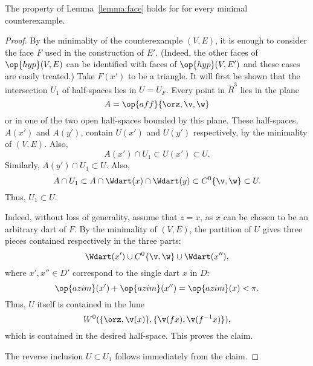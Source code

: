 
\begin{lemma}  The property  of Lemma~\ref{lemma:face} holds for for every minimal counterexample.
\end{lemma}
%

\begin{proof}
By the minimality of the counterexample $(V,E)$, it is enough to consider
the face $F$ used in the construction of $E'$.  (Indeed, the other faces of $\op{hyp}(V,E)$ can be identified with faces of $\op{hyp}(V,E')$ and these cases are easily treated.) Take $F(x')$ to be a triangle.
It will first be shown that the intersection $U_1$ of half-spaces lies in $U=U_F$.
Every point in $\ring{R}^3$ lies in the plane
$$
A=\op{aff}\{\orz,\v,\w\}
$$
or in one of the two open half-spaces bounded by this plane.  These half-spaces, $A(x')$ and $A(y')$, 
contain $U(x')$ and $U(y')$ respectively, by the minimality of $(V,E)$.  Also,
$$
A(x')\cap U_1 \subset U(x')\subset U.
$$
Similarly, $A(y')\cap U_1 \subset U$.  Also,
$$
A \cap U_1 \subset A \cap \Wdart(x) \cap \Wdart(y) \subset C^0\{\v,\w\} \subset U.
$$
Thus,
$U_1\subset U$.

 Indeed, without loss of generality, assume that $z=x$, 
as $x$ can be chosen to be an
arbitrary dart of $F$.  By the minimality of $(V,E)$,  
the partition  of $U$ gives three pieces
contained respectively in the three parts:
$$
\Wdart(x') \cup C^0\{\v,\w\} \cup \Wdart(x''),
$$
where $x',x''\in D'$ correspond to the single dart $x$ in $D$:
$$
\op{azim}(x') + \op{azim}(x'') = \op{azim}(x) < \pi.
$$
Thus, $U$ itself is contained in the lune
$$
W^0(\{\orz,\v(x)\},\{\v(f x),\v(f^{-1} x)\}),
$$
which is contained in the desired half-space.  This proves the claim.

The reverse inclusion $U\subset U_1$ follows immediately from the claim.
\end{proof}

